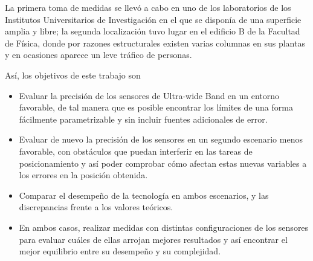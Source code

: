 La primera toma de medidas se llevó a cabo en uno de los laboratorios de los Institutos Universitarios de Investigación en el que se disponía de una superficie amplia y libre; la segunda localización tuvo lugar en el edificio B de la Facultad de Física, donde por razones estructurales existen varias columnas en sus plantas y en ocasiones aparece un leve tráfico de personas.

Así, los objetivos de este trabajo son
\begin{itemize}
    \item Evaluar la precisión de los sensores de Ultra-wide Band en un entorno favorable, de tal manera que es posible encontrar los límites de una forma fácilmente parametrizable y sin incluir fuentes adicionales de error.
    \item Evaluar de nuevo la precisión de los sensores en un segundo escenario menos favorable, con obstáculos que puedan interferir en las tareas de posicionamiento y así poder comprobar cómo afectan estas nuevas variables a los errores en la posición obtenida.
    \item Comparar el desempeño de la tecnología en ambos escenarios, y las discrepancias frente a los valores teóricos.
    \item En ambos casos, realizar medidas con distintas configuraciones de los sensores para evaluar cuáles de ellas arrojan mejores resultados y así encontrar el mejor equilibrio entre su desempeño y su complejidad.
\end{itemize}